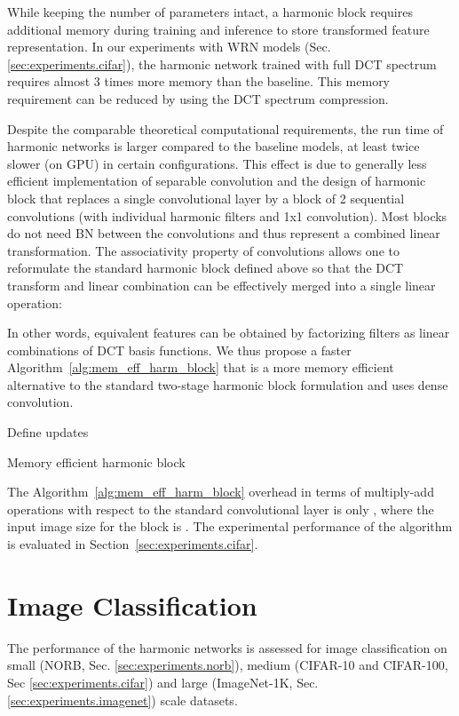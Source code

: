 \documentclass[12pt,a4paper]{article}
\begin{document}
While keeping the number of parameters intact, a harmonic block requires additional memory during training and inference to store transformed feature representation. In our experiments with WRN models (Sec.\ref{sec:experiments.cifar}), the harmonic network trained with full DCT spectrum requires almost 3 times more memory than the baseline.
This memory requirement can be reduced by using the DCT spectrum compression.

Despite the comparable theoretical computational requirements, the run time of harmonic networks is larger compared to the baseline models, at least twice slower (on GPU) in certain configurations. This effect is due to generally less efficient implementation of separable convolution and the design of harmonic block that replaces a single convolutional layer by a block of 2 sequential convolutions (with individual harmonic filters and 1x1 convolution). Most blocks do not need BN between the convolutions and thus represent a combined linear transformation. The associativity property of convolutions allows one to reformulate the standard harmonic block defined above so that the DCT transform and linear combination can be effectively merged into a single linear operation:

In other words, equivalent features can be obtained by factorizing filters as linear combinations of DCT basis functions. We thus propose a faster Algorithm~\ref{alg:mem_eff_harm_block} that is a more memory efficient alternative to the standard two-stage harmonic block formulation and uses dense convolution. 

\begin{algorithm}[t]
 \KwIn{}
 {Define updates} \;
 \For{}{
  \For{}{
   \;
  }
 }
 \;
 \KwOut{}
 \caption{Memory efficient harmonic block} 
 \label{alg:mem_eff_harm_block}
\end{algorithm}
The Algorithm~\ref{alg:mem_eff_harm_block} overhead in terms of multiply-add operations with respect to the standard convolutional layer is only , where the input image size for the block is . The experimental performance of the algorithm is evaluated in Section~\ref{sec:experiments.cifar}. 



\section{Image Classification } 
\label{sec:experiments1}

The performance of the harmonic networks is assessed for image classification  on small (NORB, Sec. \ref{sec:experiments.norb}), medium (CIFAR-10 and CIFAR-100, Sec \ref{sec:experiments.cifar}) and large (ImageNet-1K, Sec. \ref{sec:experiments.imagenet}) scale datasets.
\end{document}
